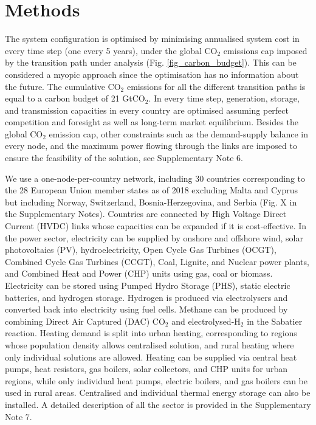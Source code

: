 \documentclass[5p]{elsarticle} %
\begin{document}
\section{Methods}

The system configuration is optimised by minimising annualised system cost in every time step (one every 5 years), under the global CO$_2$ emissions cap imposed by the transition path under analysis (Fig. \ref{fig_carbon_budget}). This can be considered a myopic approach since the optimisation has no information about the future. The cumulative CO$_2$ emissions for all the different transition paths is equal to a carbon budget of 21 GtCO$_2$. In every time step, generation, storage, and transmission capacities in every country are optimised assuming perfect competition and foresight as well as long-term market equilibrium. Besides the global CO$_2$ emission cap, other constraints such as the demand-supply balance in every node, and the maximum power flowing through the links are imposed to ensure the feasibility of the solution, see Supplementary Note 6. \

We use a one-node-per-country network, including 30 countries corresponding to the 28 European Union member states as of 2018 excluding Malta and Cyprus but including Norway, Switzerland, Bosnia-Herzegovina, and Serbia (Fig. \textcolor[rgb]{1,0,0}{X} in the Supplementary Notes). Countries are connected by High Voltage Direct Current (HVDC) links whose capacities can be expanded if it is cost-effective. In the power sector, electricity can be supplied by onshore and offshore wind, solar photovoltaics (PV), hydroelectricity, Open Cycle Gas Turbines (OCGT), Combined Cycle Gas Turbines (CCGT), Coal, Lignite, and Nuclear power plants, and Combined Heat and Power (CHP) units using gas, coal or biomass. Electricity can be stored using Pumped Hydro Storage (PHS), static electric batteries, and hydrogen storage. Hydrogen is produced via electrolysers and converted back into electricity using fuel cells. Methane can be produced by combining Direct Air Captured (DAC) CO$_2$ and electrolysed-H$_2$ in the Sabatier reaction.  
Heating demand is split into urban heating, corresponding to regions whose population density allows centralised solution, and rural heating where only individual solutions are allowed. Heating can be supplied via central heat pumps, heat resistors, gas boilers, solar collectors, and CHP units for urban regions, while only individual heat pumps, electric boilers, and gas boilers can be used in rural areas. Centralised and individual thermal energy storage can also be installed. A detailed description of all the sector is provided in the Supplementary Note 7. \
\end{document}
